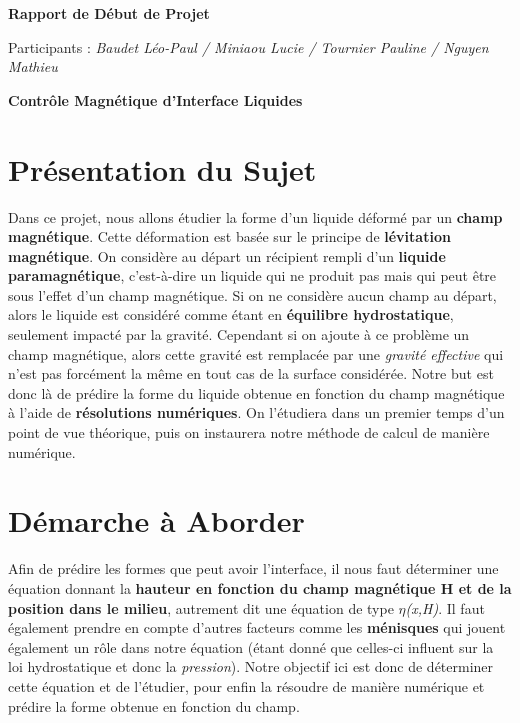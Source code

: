 \documentclass{article}
\begin{document}
\begin{center}
{\huge \textbf{Rapport de Début de Projet}}
\end{center}

\begin{center}
Participants : \textit{Baudet Léo-Paul / Miniaou Lucie / Tournier Pauline / Nguyen Mathieu\\}

\end{center}
\vspace{0.05\textheight}
\begin{center}
{\LARGE \textbf{Contrôle Magnétique d'Interface Liquides}}
\end{center}

\section{Présentation du Sujet}
Dans ce projet, nous allons étudier la forme d'un liquide déformé par un \textbf{champ magnétique}. Cette déformation est basée sur le principe de \textbf{lévitation magnétique}.
\newline
On considère au départ un récipient rempli d'un \textbf{liquide paramagnétique}, c'est-à-dire un liquide qui ne produit pas mais qui peut être sous l'effet d'un champ magnétique. Si on ne considère aucun champ au départ, alors le liquide est considéré comme étant en \textbf{équilibre hydrostatique}, seulement impacté par la gravité. Cependant si on ajoute à ce problème un champ magnétique, alors cette gravité est remplacée par une \textit{gravité effective} qui n'est pas forcément la même en tout cas de la surface considérée. 
\newline
Notre but est donc là de prédire la forme du liquide obtenue en fonction du champ magnétique à l'aide de \textbf{résolutions numériques}. On l'étudiera dans un premier temps d'un point de vue théorique, puis on instaurera notre méthode de calcul de manière numérique.

\section{Démarche à Aborder}
Afin de prédire les formes que peut avoir l'interface, il nous faut déterminer une équation donnant la \textbf{hauteur en fonction du champ magnétique H et de la position dans le milieu}, autrement dit une équation de type \textit{$\eta$(x,H)}. Il faut également prendre en compte d'autres facteurs comme les \textbf{ménisques} qui jouent également un rôle dans notre équation (étant donné que celles-ci influent sur la loi hydrostatique et donc la \textit{pression}). Notre objectif ici est donc de déterminer cette équation et de l'étudier, pour enfin la résoudre de manière numérique et prédire la forme obtenue en fonction du champ.
\end{document}
